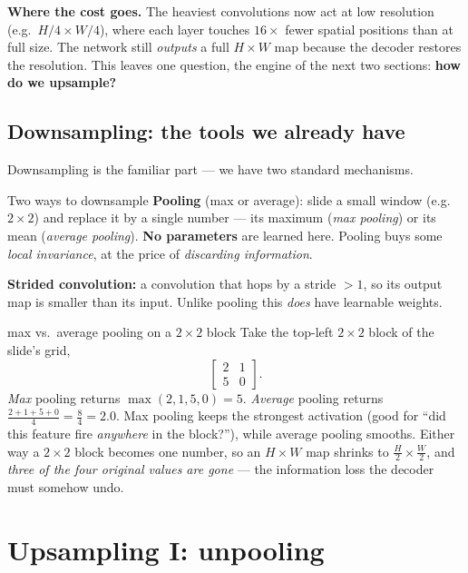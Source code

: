 \documentclass{report}
\begin{document}
\begin{keybox}
\textbf{Where the cost goes.} The heaviest convolutions now act at low
resolution (e.g.\ $H/4\times W/4$), where each layer touches $16\times$ fewer
spatial positions than at full size. The network still \emph{outputs} a full
$H\times W$ map because the decoder restores the resolution. This leaves one
question, the engine of the next two sections: \textbf{how do we upsample?}
\end{keybox}

\subsection{Downsampling: the tools we already have}

Downsampling is the familiar part --- we have two standard mechanisms.

\begin{defbox}{Two ways to downsample}
\textbf{Pooling} (max or average): slide a small window (e.g.\ $2\times2$) and
replace it by a single number --- its maximum (\emph{max pooling}) or its mean
(\emph{average pooling}). \textbf{No parameters} are learned here. Pooling buys
some \emph{local invariance}, at the price of \emph{discarding information}.

\medskip
\textbf{Strided convolution:} a convolution that hops by a stride $>1$, so its
output map is smaller than its input. Unlike pooling this \emph{does} have
learnable weights.
\end{defbox}

\begin{exbox}{max vs.\ average pooling on a $2\times2$ block}
Take the top-left $2\times2$ block of the slide's grid,
\[
\begin{bmatrix} 2 & 1 \\ 5 & 0 \end{bmatrix}.
\]
\emph{Max} pooling returns $\max(2,1,5,0)=5$. \emph{Average} pooling returns
$\tfrac{2+1+5+0}{4}=\tfrac{8}{4}=2.0$. Max pooling keeps the strongest
activation (good for ``did this feature fire \emph{anywhere} in the block?''),
while average pooling smooths. Either way a $2\times2$ block becomes one number,
so an $H\times W$ map shrinks to $\tfrac{H}{2}\times\tfrac{W}{2}$, and
\emph{three of the four original values are gone} --- the information loss the
decoder must somehow undo.
\end{exbox}

\section{Upsampling I: unpooling}
\end{document}
